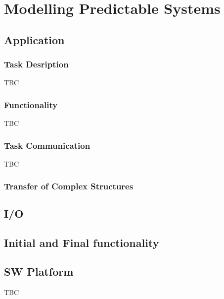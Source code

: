 \documentclass{article}
\begin{document}


\section{Modelling Predictable Systems}
\label{sec:mod_pred}

\subsection{Application}
\label{sec:application}



\subsubsection{Task Desription}
\label{sec:app_arch}
TBC

\subsubsection{Functionality}
\label{sec:func}
TBC

\subsubsection{Task Communication}
\label{sec:app_comm}
TBC

\subsubsection{Transfer of Complex Structures}
\label{sec:app_complex_structures}



\subsection{I/O}
\label{sec:io}

\subsection{Initial and Final functionality}
\label{sec:app_initialization}



\subsection{SW Platform}
\label{sec:sw_platform}
TBC
\end{document}
